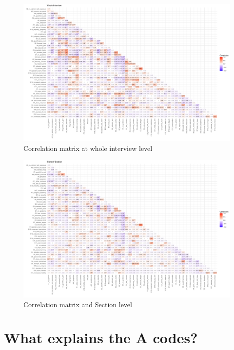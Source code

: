 \documentclass[]{article}
\begin{document}
\begin{landscape}
	\begin{figure}[H]
		\centering
		\caption{Correlation matrix at whole interview level} 
		\label{fig:cormat_whole}
		\includegraphics[width=  \linewidth]{cormat_whole}
	\end{figure}

	\begin{figure}[H]
		\centering
		\caption{Correlation matrix and Section level} 
		\label{fig:cormat_sec}
		\includegraphics[width= \linewidth]{cormat_section}
	\end{figure}


\end{landscape}




\section{What explains the A codes?}
\end{document}
